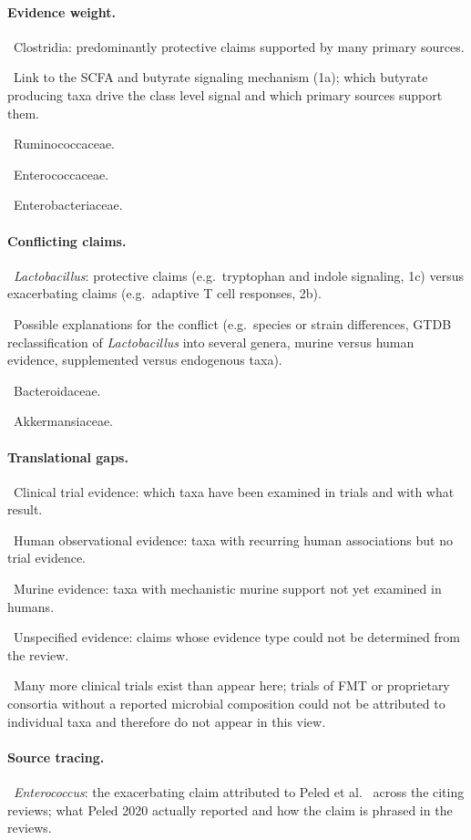 \documentclass[11pt,a4paper]{article}
\newcommand{\todoitem}[1]{\par\noindent\textcolor{blue!70!black}{\textbullet~#1}}
\begin{document}
\paragraph{Evidence weight.}
\todoitem{Clostridia: predominantly protective claims supported by many primary sources.}
\todoitem{Link to the SCFA and butyrate signaling mechanism (1a); which butyrate producing taxa drive the class level signal and which primary sources support them.}
\todoitem{Ruminococcaceae.}
\todoitem{Enterococcaceae.}
\todoitem{Enterobacteriaceae.}

\paragraph{Conflicting claims.}
\todoitem{\textit{Lactobacillus}: protective claims (e.g.\ tryptophan and indole signaling, 1c) versus exacerbating claims (e.g.\ adaptive T cell responses, 2b).}
\todoitem{Possible explanations for the conflict (e.g.\ species or strain differences, GTDB reclassification of \textit{Lactobacillus} into several genera, murine versus human evidence, supplemented versus endogenous taxa).}
\todoitem{Bacteroidaceae.}
\todoitem{Akkermansiaceae.}

\paragraph{Translational gaps.}
\todoitem{Clinical trial evidence: which taxa have been examined in trials and with what result.}
\todoitem{Human observational evidence: taxa with recurring human associations but no trial evidence.}
\todoitem{Murine evidence: taxa with mechanistic murine support not yet examined in humans.}
\todoitem{Unspecified evidence: claims whose evidence type could not be determined from the review.}
\todoitem{Many more clinical trials exist than appear here; trials of FMT or proprietary consortia without a reported microbial composition could not be attributed to individual taxa and therefore do not appear in this view.}

\paragraph{Source tracing.}
\todoitem{\textit{Enterococcus}: the exacerbating claim attributed to Peled et al.~\cite{peled2020microbiota-644} across the citing reviews; what Peled 2020 actually reported and how the claim is phrased in the reviews.}



\end{document}
